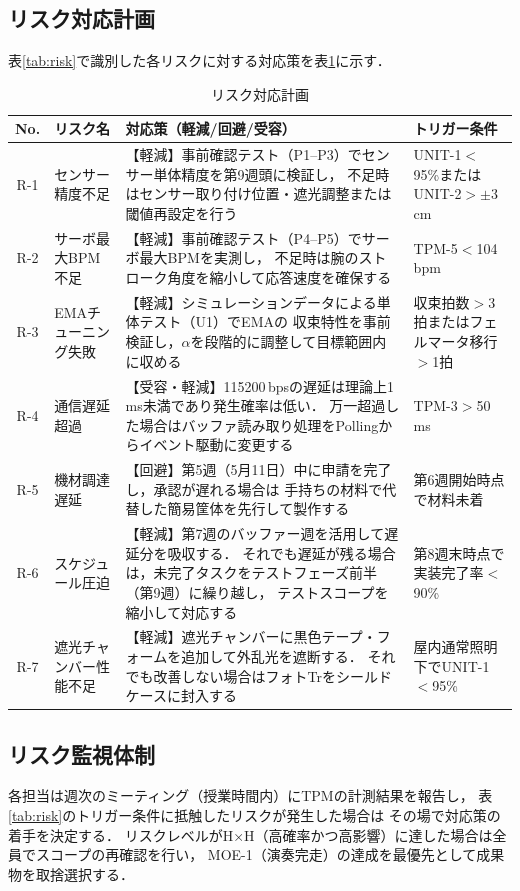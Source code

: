 \subsection{リスク対応計画}

表\ref{tab:risk}で識別した各リスクに対する対応策を表\ref{tab:risk-response}に示す．

\begin{table}[H]
  \centering
  \caption{リスク対応計画}
  \label{tab:risk-response}
  \small
  \begin{tabularx}{\linewidth}{clXX}
    \toprule
    No. & リスク名 & 対応策（軽減/回避/受容） & トリガー条件 \\
    \midrule
    R-1 & センサー精度不足 &
      【軽減】事前確認テスト（P1--P3）でセンサー単体精度を第9週頭に検証し，
      不足時はセンサー取り付け位置・遮光調整または閾値再設定を行う &
      UNIT-1$<$95\%またはUNIT-2$>\pm3\,$cm \\
    R-2 & サーボ最大BPM不足 &
      【軽減】事前確認テスト（P4--P5）でサーボ最大BPMを実測し，
      不足時は腕のストローク角度を縮小して応答速度を確保する &
      TPM-5$<$104\,bpm \\
    R-3 & EMAチューニング失敗 &
      【軽減】シミュレーションデータによる単体テスト（U1）でEMAの
      収束特性を事前検証し，$\alpha$を段階的に調整して目標範囲内に収める &
      収束拍数$>$3拍またはフェルマータ移行$>$1拍 \\
    R-4 & 通信遅延超過 &
      【受容・軽減】115200\,bpsの遅延は理論上1\,ms未満であり発生確率は低い．
      万一超過した場合はバッファ読み取り処理をPollingからイベント駆動に変更する &
      TPM-3$>$50\,ms \\
    R-5 & 機材調達遅延 &
      【回避】第5週（5月11日）中に申請を完了し，承認が遅れる場合は
      手持ちの材料で代替した簡易筐体を先行して製作する &
      第6週開始時点で材料未着 \\
    R-6 & スケジュール圧迫 &
      【軽減】第7週のバッファー週を活用して遅延分を吸収する．
      それでも遅延が残る場合は，未完了タスクをテストフェーズ前半（第9週）に繰り越し，
      テストスコープを縮小して対応する &
      第8週末時点で実装完了率$<$90\% \\
    R-7 & 遮光チャンバー性能不足 &
      【軽減】遮光チャンバーに黒色テープ・フォームを追加して外乱光を遮断する．
      それでも改善しない場合はフォトTrをシールドケースに封入する &
      屋内通常照明下でUNIT-1$<$95\% \\
    \bottomrule
  \end{tabularx}
\end{table}

\subsection{リスク監視体制}

各担当は週次のミーティング（授業時間内）にTPMの計測結果を報告し，
表\ref{tab:risk}のトリガー条件に抵触したリスクが発生した場合は
その場で対応策の着手を決定する．
リスクレベルがH×H（高確率かつ高影響）に達した場合は全員でスコープの再確認を行い，
MOE-1（演奏完走）の達成を最優先として成果物を取捨選択する．

